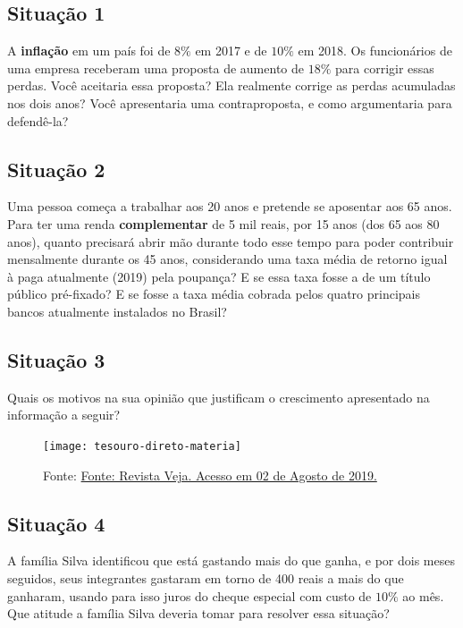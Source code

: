 \subsection{Situação 1}
A \textbf{inflação} em um país foi de $8\%$ em 2017 e de $10\%$ em 2018. Os funcionários de uma empresa receberam uma proposta de aumento de $18\%$ para corrigir essas perdas. Você aceitaria essa proposta? Ela realmente corrige as perdas acumuladas nos dois anos? Você apresentaria uma contraproposta, e como argumentaria para defendê-la?


\subsection{Situação 2}
Uma pessoa começa a trabalhar aos 20 anos e pretende se aposentar aos 65 anos. Para ter uma renda \textbf{complementar} de 5 mil reais, por 15 anos (dos 65 aos 80 anos), quanto precisará abrir mão durante todo esse tempo para poder contribuir mensalmente durante os 45 anos, considerando uma taxa média de retorno igual à paga atualmente (2019) pela poupança? E se essa taxa fosse a de um título público pré-fixado? E se fosse a taxa média cobrada pelos quatro principais bancos atualmente instalados no Brasil? 


\subsection{Situação 3}
Quais os motivos na sua opinião que justificam o crescimento apresentado na informação a seguir?


\begin{figure}[H]
\centering
\noindent\texttt{[image: tesouro-direto-materia]}

\caption{Fonte: \href{https://veja.abril.com.br/economia/investidores-no-tesouro-direto-crescem-36-no-primeiro-semestre/}{Fonte: Revista Veja. Acesso em 02 de Agosto de 2019.}}
\end{figure}



\subsection{Situação 4}
A família Silva identificou que está gastando mais do que ganha, e por dois meses seguidos, seus integrantes gastaram em torno de 400 reais a mais do que ganharam, usando para isso juros do cheque especial com custo de $10\%$ ao mês. Que atitude a família Silva deveria tomar para resolver essa situação? 


